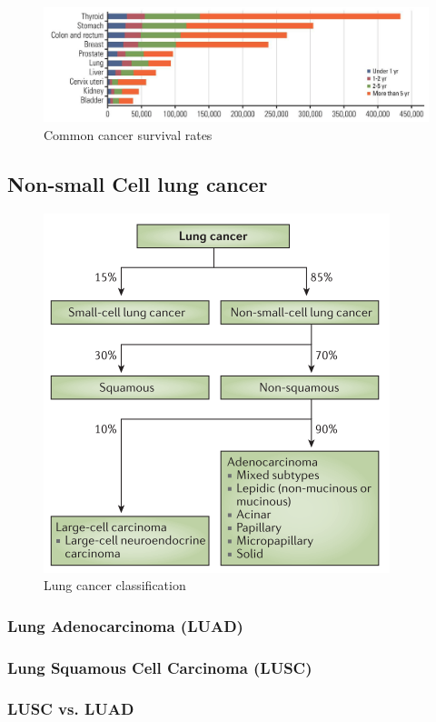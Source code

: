 \documentclass[11pt,a4paper,onecolumn,oneside]{report}
\begin{document}
            \begin{figure}[p]
                \centering
                \includegraphics[width=0.8 \linewidth]{figures/LungCancer/rate.png}
                \caption{Common cancer survival rates \protect\cite{lung6}}
                \label{fig:cancer-survival}
            \end{figure}

        \subsection{Non-small Cell lung cancer}

            \begin{figure}[p]
                \centering
                \includegraphics[width=0.4 \linewidth]{figures/LungCancer/classification.png}
                \caption{Lung cancer classification \protect\cite{NSCLC-3}}
                \label{fig:lungcancer-classification}
            \end{figure}

            \subsubsection{Lung Adenocarcinoma (LUAD)}

            \subsubsection{Lung Squamous Cell Carcinoma (LUSC)}

            \subsubsection{LUSC vs. LUAD}
\end{document}
